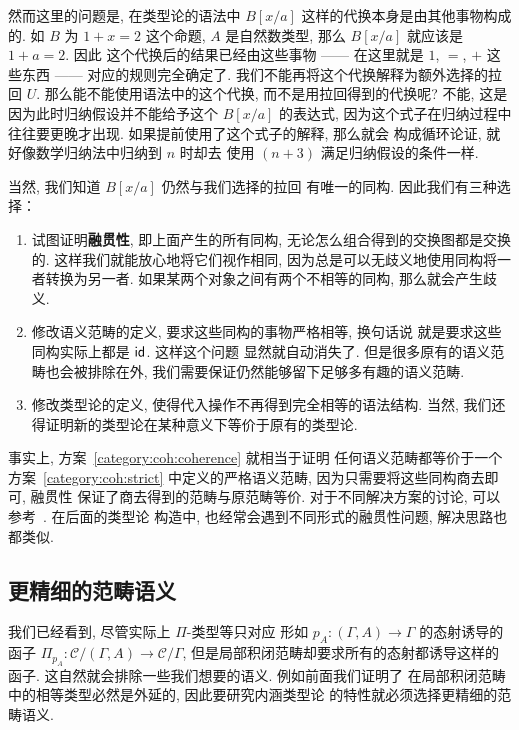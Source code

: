 然而这里的问题是, 在类型论的语法中 \(B[x/a]\)
这样的代换本身是由其他事物构成的. 如 \(B\) 为
\(1 + x = 2\) 这个命题, \(A\) 是自然数类型,
那么 \(B[x/a]\) 就应该是 \(1 + a = 2\). 因此
这个代换后的结果已经由这些事物 ------ 在这里就是
\(1\), \(=\), \(+\) 这些东西 ------ 对应的规则完全确定了.
我们不能再将这个代换解释为额外选择的拉回 \(U\).
那么能不能使用语法中的这个代换, 而不是用拉回得到的代换呢?
不能, 这是因为此时归纳假设并不能给予这个 \(B[x/a]\)
的表达式, 因为这个式子在归纳过程中往往要更晚才出现.
如果提前使用了这个式子的解释, 那么就会
构成循环论证, 就好像数学归纳法中归纳到 \(n\) 时却去
使用 \((n+3)\) 满足归纳假设的条件一样.

当然, 我们知道 \(B[x/a]\) 仍然与我们选择的拉回
有唯一的同构. 因此我们有三种选择：
\begin{enumerate}
\item\label{category:coh:coherence} 试图证明\textbf{融贯性},
即上面产生的所有同构, 无论怎么组合得到的交换图都是交换的.
这样我们就能放心地将它们视作相同,
因为总是可以无歧义地使用同构将一者转换为另一者.
如果某两个对象之间有两个不相等的同构, 那么就会产生歧义.
\item\label{category:coh:strict} 修改语义范畴的定义,
要求这些同构的事物严格相等, 换句话说
就是要求这些同构实际上都是 \(\textsf{id}\). 这样这个问题
显然就自动消失了. 但是很多原有的语义范畴也会被排除在外,
我们需要保证仍然能够留下足够多有趣的语义范畴.
\item\label{category:coh:weak} 修改类型论的定义,
使得代入操作不再得到完全相等的语法结构. 当然,
我们还得证明新的类型论在某种意义下等价于原有的类型论.
\end{enumerate}
事实上, 方案~\ref{category:coh:coherence} 就相当于证明
任何语义范畴都等价于一个方案~\ref{category:coh:strict}
中定义的严格语义范畴, 因为只需要将这些同构商去即可, 融贯性
保证了商去得到的范畴与原范畴等价. 对于不同解决方案的讨论,
可以参考~\cite{curien:2014:revisit}. 在后面的类型论
构造中, 也经常会遇到不同形式的融贯性问题, 解决思路也都类似.

\subsection{更精细的范畴语义}
我们已经看到, 尽管实际上 \(\Pi\)-类型等只对应
形如 \(p_A : (\Gamma, A) \to \Gamma\) 的态射诱导的
函子 \(\Pi_{p_A} : \mathcal C/(\Gamma, A) \to \mathcal C/\Gamma\),
但是局部积闭范畴却要求所有的态射都诱导这样的函子.
这自然就会排除一些我们想要的语义. 例如前面我们证明了
在局部积闭范畴中的相等类型必然是外延的, 因此要研究内涵类型论
的特性就必须选择更精细的范畴语义.

